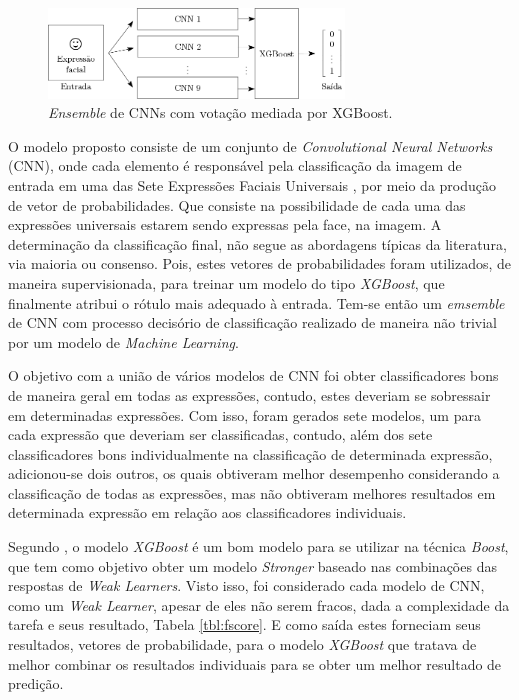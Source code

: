 \begin{figure}[!htb]
    \centering
    \caption{\emph{Ensemble} de CNNs com votação mediada por XGBoost.} \label{fig:ensemble}
    \includegraphics[width=0.7\textwidth]{images/ensemble-elloa.png}
\end{figure}



\iffalse
O modelo proposto consiste de um conjunto de \emph{Convolutional Neural Networks} (CNN), onde cada elemento é responsável pela classificação da imagem de entrada em uma das Sete Expressões Faciais Universais \cite{}, por meio da produção de vetor de probabilidades. Que consiste na possibilidade de cada uma das expressões universais estarem sendo expressas pela face, na imagem. A determinação da classificação final, não segue as abordagens típicas da literatura, via maioria ou consenso. Pois, estes vetores de probabilidades foram utilizados, de maneira supervisionada, para treinar um modelo do tipo \emph{XGBoost}, que finalmente atribui o rótulo mais adequado à entrada. Tem-se então um \emph{emsemble} de CNN com processo decisório de classificação realizado de maneira não trivial por um modelo de \emph{Machine Learning}.

O objetivo com a união de vários modelos de CNN foi obter classificadores bons de maneira geral em todas as expressões, contudo, estes deveriam se sobressair em determinadas expressões. Com isso, foram gerados sete modelos, um para cada expressão que deveriam ser classificadas, contudo, além dos sete classificadores bons individualmente na classificação de determinada expressão, adicionou-se dois outros, os quais obtiveram melhor desempenho considerando a classificação de todas as expressões, mas não obtiveram melhores resultados em determinada expressão em relação aos classificadores individuais.

Segundo \cite{}, o modelo \emph{XGBoost} é um bom modelo para se utilizar na técnica \emph{Boost}, que tem como objetivo obter um modelo \emph{Stronger} baseado nas combinações das respostas de \emph{Weak Learners}. Visto isso, foi considerado cada modelo de CNN, como um \emph{Weak Learner}, apesar de eles não serem fracos, dada a complexidade da tarefa e seus resultado, Tabela \ref{tbl:fscore}. E como saída estes forneciam seus resultados, vetores de probabilidade, para o modelo \emph{XGBoost} que tratava de melhor combinar os resultados individuais para se obter um melhor resultado de predição.

